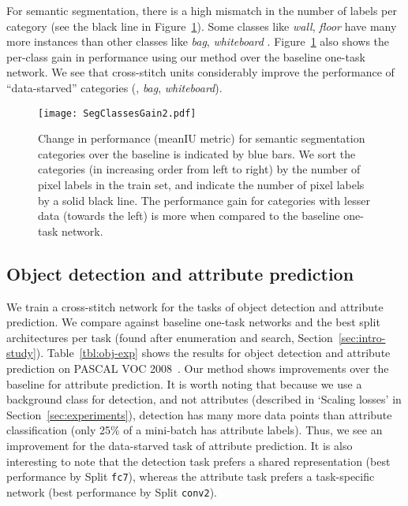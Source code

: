 \documentclass[10pt,twocolumn,letterpaper]{article}
\begin{document}
For semantic segmentation, there is a high mismatch in the number of labels per category (see the black line in Figure~\ref{fig:data-starved-gain}). Some classes like \emph{wall}, \emph{floor} have many more instances than other classes like \emph{bag}, \emph{whiteboard} \etc. Figure~\ref{fig:data-starved-gain} also shows the per-class gain in performance using our method over the baseline one-task network. We see that cross-stitch units considerably improve the performance of ``data-starved'' categories (\eg, \emph{bag}, \emph{whiteboard}).

\begin{figure}
\texttt{[image: SegClassesGain2.pdf]}
\caption{Change in performance (meanIU metric) for semantic segmentation categories over the baseline is indicated by blue bars. We sort the categories (in increasing order from left to right) by the number of pixel labels in the train set, and indicate the number of pixel labels by a solid black line. The performance gain for categories with lesser data (towards the left) is more when compared to the baseline one-task network.}
\vspace{-0.1in}
\label{fig:data-starved-gain}
\end{figure}

\subsection{Object detection and attribute prediction}
We train a cross-stitch network for the tasks of object detection and attribute prediction. We compare against baseline one-task networks and the best split architectures per task (found after enumeration and search, Section~\ref{sec:intro-study}). Table~\ref{tbl:obj-exp} shows the results for object detection and attribute prediction on PASCAL VOC 2008~\cite{pascal,apascal}. Our method shows improvements over the baseline for attribute prediction. It is worth noting that because we use a background class for detection, and not attributes (described in `Scaling losses' in Section~\ref{sec:experiments}), detection has many more data points than attribute classification (only 25\% of a mini-batch has attribute labels). Thus, we see an improvement for the data-starved task of attribute prediction. It is also interesting to note that the detection task prefers a shared representation (best performance by Split \texttt{fc7}), whereas the attribute task prefers a task-specific network (best performance by Split \texttt{conv2}).
\end{document}
